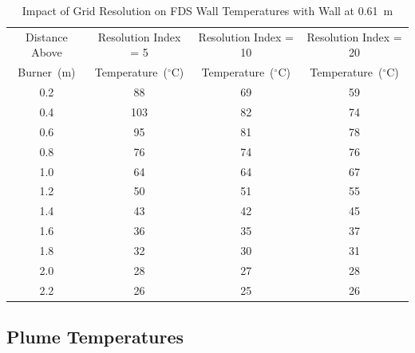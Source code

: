 \documentclass[twoside]{uocthesis}
\begin{document}
\begin{table}
	\small
	\centering
	\begin{tabular}{|c|c|c|c|}
		\hline Distance Above  & Resolution Index = 5      & Resolution Index = 10     & Resolution Index = 20 \\
		Burner~(m)	   & Temperature~($^{\circ}$C) & Temperature~($^{\circ}$C) & Temperature~($^{\circ}$C)	\\ \hline
		\hline 0.2 			   & 88						   & 69						& 59 			 	\\
		\hline 0.4			   & 103					   & 82						& 74			 	\\
		\hline 0.6			   & 95						   & 81						& 78			 	\\
		\hline 0.8			   & 76						   & 74						& 76				\\
		\hline 1.0			   & 64						   & 64 					& 67				\\
		\hline 1.2			   & 50						   & 51 					& 55				\\
		\hline 1.4			   & 43						   & 42 					& 45				\\
		\hline 1.6			   & 36						   & 35 					& 37				\\
		\hline 1.8			   & 32						   & 30 					& 31				\\
		\hline 2.0			   & 28						   & 27 					& 28				\\
		\hline 2.2			   & 26						   & 25 					& 26				\\
		\hline
	\end{tabular}
	\caption[Impact of Grid Resolution on FDS Wall Temperatures with Wall at 0.61~m]{Impact of Grid Resolution on FDS Wall Temperatures with Wall at 0.61~m}
	\label{tab:FDSRI_wall2D}
\end{table}

\subsection{Plume Temperatures}
\end{document}
